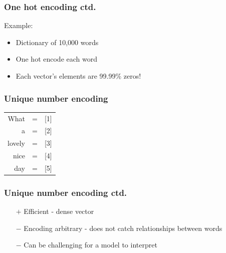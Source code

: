 \begin{frame}
\frametitle{One hot encoding ctd.}

	Example:
	\begin{itemize}
		\item Dictionary of 10,000 words
		\item One hot encode each word
		\item Each vector's elements are 99.99\% zeros!
		
	\end{itemize}

\end{frame}

\begin{frame}
\frametitle{Unique number encoding}

\begin{table}[h]
	\hspace{15mm}
	\huge
	\begin{tabular}{rcl}
		What & = & [1] \\
		a & = & [2]\\
		lovely & = & [3]\\
		nice & = & [4]\\
		day & = & [5]\\
	\end{tabular}
\end{table}


\end{frame}

\begin{frame}
\frametitle{Unique number encoding ctd.}

	\begin{itemize}
		\item[$+$] Efficient - dense vector
		\item[$-$] Encoding arbitrary - does not catch relationships between words
		\item[$-$] Can be challenging for a model to interpret
	\end{itemize}

\end{frame}

